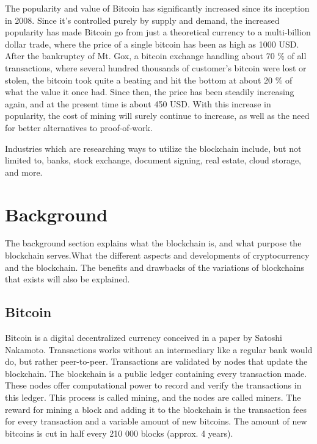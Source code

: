 \documentclass[12pt]{article}
\begin{document}
The popularity and value of Bitcoin has significantly increased since its inception in 2008. Since it's controlled purely by supply and demand, the increased popularity has made Bitcoin go from just a theoretical currency to a multi-billion dollar trade, where the price of a single bitcoin has been as high as 1000 USD. After the bankruptcy of Mt. Gox, a bitcoin exchange handling about 70 \% of all transactions, where several hundred thousands of customer's bitcoin were lost or stolen, the bitcoin took quite a beating and hit the bottom at about 20 \% of what the value it once had. Since then, the price has been steadily increasing again, and at the present time is about 450 USD. With this increase in popularity, the cost of mining will surely continue to increase, as well as the need for better alternatives to proof-of-work.

Industries which are researching ways to utilize the blockchain include, but not limited to, banks, stock exchange, document signing, real estate, cloud storage, and more. 

\section{Background}
The background section explains what the blockchain is, and what purpose the blockchain serves.What the different aspects and developments of cryptocurrency and the blockchain. The benefits and drawbacks of the variations of blockchains that exists will also be explained. 

\subsection{Bitcoin}

Bitcoin is a digital decentralized currency conceived in a paper by Satoshi Nakamoto\cite{nakamoto2009bitcoin}. Transactions works without an intermediary like a regular bank would do, but rather peer-to-peer. Transactions are validated by nodes that update the blockchain. The blockchain is a public ledger containing every transaction made. These nodes offer computational power to record and verify the transactions in this ledger. This process is called mining, and the nodes are called miners. The reward for mining a block and adding it to the blockchain is the transaction fees for every transaction and a variable amount of new bitcoins. The amount of new bitcoins is cut in half every 210 000 blocks (approx. 4 years).
\end{document}
